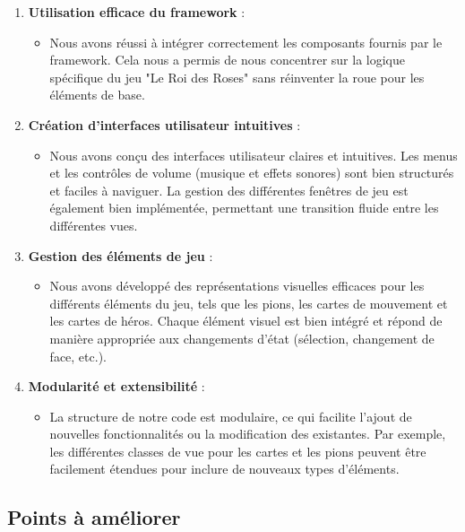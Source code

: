 \begin{enumerate}
	\item \textbf{Utilisation efficace du framework} :
	\begin{itemize}
		\item Nous avons réussi à intégrer correctement les composants fournis par le framework. Cela nous a permis de nous concentrer sur la logique spécifique du jeu "Le Roi des Roses" sans réinventer la roue pour les éléments de base.
	\end{itemize}
	
	\item \textbf{Création d'interfaces utilisateur intuitives} :
	\begin{itemize}
		\item Nous avons conçu des interfaces utilisateur claires et intuitives. Les menus et les contrôles de volume (musique et effets sonores) sont bien structurés et faciles à naviguer. La gestion des différentes fenêtres de jeu est également bien implémentée, permettant une transition fluide entre les différentes vues.
	\end{itemize}
	
	\item \textbf{Gestion des éléments de jeu} :
	\begin{itemize}
		\item Nous avons développé des représentations visuelles efficaces pour les différents éléments du jeu, tels que les pions, les cartes de mouvement et les cartes de héros. Chaque élément visuel est bien intégré et répond de manière appropriée aux changements d'état (sélection, changement de face, etc.).
	\end{itemize}
	
	\item \textbf{Modularité et extensibilité} :
	\begin{itemize}
		\item La structure de notre code est modulaire, ce qui facilite l'ajout de nouvelles fonctionnalités ou la modification des existantes. Par exemple, les différentes classes de vue pour les cartes et les pions peuvent être facilement étendues pour inclure de nouveaux types d'éléments.
	\end{itemize}
\end{enumerate}

\subsection{Points à améliorer}

